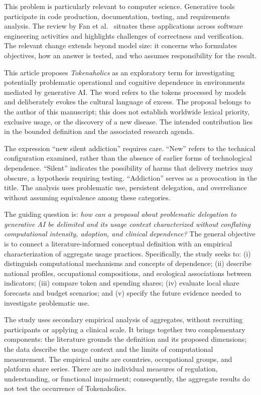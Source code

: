 \documentclass[11pt,a4paper]{article}
\begin{document}
This problem is particularly relevant to computer science. Generative tools participate in code production, documentation, testing, and requirements analysis. The review by Fan et al.\ \cite{fan} situates these applications across software engineering activities and highlights challenges of correctness and verification. The relevant change extends beyond model size: it concerns who formulates objectives, how an answer is tested, and who assumes responsibility for the result.

This article proposes \textit{Tokenaholics} as an exploratory term for investigating potentially problematic operational and cognitive dependence in environments mediated by generative AI. The word refers to the tokens processed by models and deliberately evokes the cultural language of excess. The proposal belongs to the author of this manuscript; this does not establish worldwide lexical priority, exclusive usage, or the discovery of a new disease. The intended contribution lies in the bounded definition and the associated research agenda.

The expression ``new silent addiction'' requires care. ``New'' refers to the technical configuration examined, rather than the absence of earlier forms of technological dependence. ``Silent'' indicates the possibility of harms that delivery metrics may obscure, a hypothesis requiring testing. ``Addiction'' serves as a provocation in the title. The analysis uses problematic use, persistent delegation, and overreliance without assuming equivalence among these categories.

The guiding question is: \textit{how can a proposal about problematic delegation to generative AI be delimited and its usage context characterized without conflating computational intensity, adoption, and clinical dependence?} The general objective is to connect a literature-informed conceptual definition with an empirical characterization of aggregate usage practices. Specifically, the study seeks to: (i) distinguish computational mechanisms and concepts of dependence; (ii) describe national profiles, occupational compositions, and ecological associations between indicators; (iii) compare token and spending shares; (iv) evaluate local share forecasts and budget scenarios; and (v) specify the future evidence needed to investigate problematic use.

The study uses secondary empirical analysis of aggregates, without recruiting participants or applying a clinical scale. It brings together two complementary components: the literature grounds the definition and its proposed dimensions; the data describe the usage context and the limits of computational measurement. The empirical units are countries, occupational groups, and platform share series. There are no individual measures of regulation, understanding, or functional impairment; consequently, the aggregate results do not test the occurrence of Tokenaholics.
\end{document}
